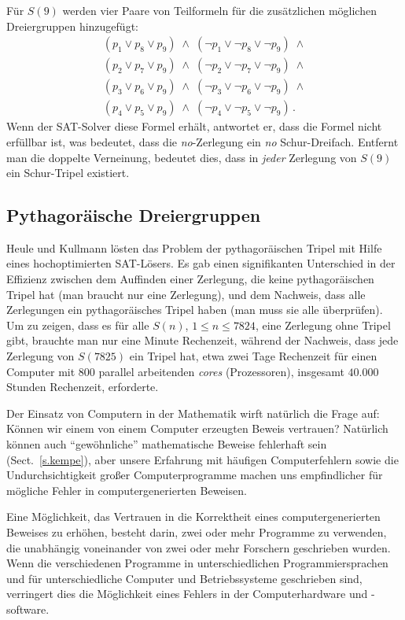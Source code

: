 Für $S(9)$ werden vier Paare von Teilformeln für die zusätzlichen möglichen Dreiergruppen hinzugefügt:
\[
\begin{array}{l}
(p_1 \vee p_8 \vee p_9) \;\wedge\; (\neg p_1 \vee \neg p_8 \vee \neg p_9) \;\wedge \\
(p_2 \vee p_7 \vee p_9) \;\wedge\; (\neg p_2 \vee \neg p_7 \vee \neg p_9) \;\wedge \\
(p_3 \vee p_6 \vee p_9) \;\wedge\; (\neg p_3 \vee \neg p_6 \vee \neg p_9) \;\wedge \\
(p_4 \vee p_5 \vee p_9) \;\wedge\; (\neg p_4 \vee \neg p_5 \vee \neg p_9)\,.
\end{array}
\]
Wenn der SAT-Solver diese Formel erhält, antwortet er, dass die Formel nicht erfüllbar ist, was bedeutet, dass die \emph{no}-Zerlegung ein \emph{no} Schur-Dreifach. Entfernt man die doppelte Verneinung, bedeutet dies, dass in \emph{jeder} Zerlegung von $S(9)$ ein Schur-Tripel existiert.

\subsection{Pythagoräische Dreiergruppen}

Heule und Kullmann lösten das Problem der pythagoräischen Tripel mit Hilfe eines hochoptimierten SAT-Lösers. Es gab einen signifikanten Unterschied in der Effizienz zwischen dem Auffinden einer Zerlegung, die keine pythagoräischen Tripel hat (man braucht nur eine Zerlegung), und dem Nachweis, dass alle Zerlegungen ein pythagoräisches Tripel haben (man muss sie alle überprüfen). Um zu zeigen, dass es für alle $S(n)$, $1\leq n\leq 7824$, eine Zerlegung ohne Tripel gibt, brauchte man nur eine Minute Rechenzeit, während der Nachweis, dass jede Zerlegung von $S(7825)$ ein Tripel hat, etwa zwei Tage Rechenzeit für einen Computer mit $800$ parallel arbeitenden \emph{cores} (Prozessoren), insgesamt $40.000$ Stunden Rechenzeit, erforderte.

Der Einsatz von Computern in der Mathematik wirft natürlich die Frage auf: Können wir einem von einem Computer erzeugten Beweis vertrauen? Natürlich können auch ``gewöhnliche'' mathematische Beweise fehlerhaft sein (Sect.~\ref{s.kempe}), aber unsere Erfahrung mit häufigen Computerfehlern sowie die Undurchsichtigkeit großer Computerprogramme machen uns empfindlicher für mögliche Fehler in computergenerierten Beweisen.

Eine Möglichkeit, das Vertrauen in die Korrektheit eines computergenerierten Beweises zu erhöhen, besteht darin, zwei oder mehr Programme zu verwenden, die unabhängig voneinander von zwei oder mehr Forschern geschrieben wurden. Wenn die verschiedenen Programme in unterschiedlichen Programmiersprachen und für unterschiedliche Computer und Betriebssysteme geschrieben sind, verringert dies die Möglichkeit eines Fehlers in der Computerhardware und -software.

